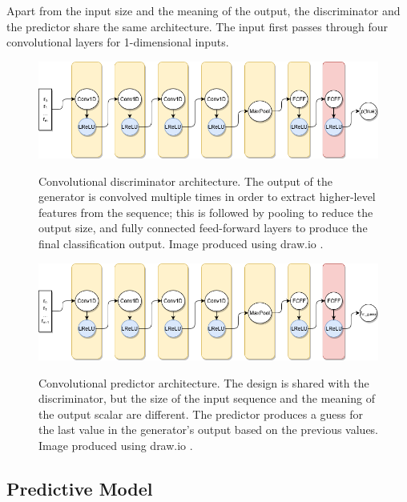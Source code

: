 \documentclass[12pt, titlepage]{report}
\theoremstyle{definition}
\begin{document}
Apart from the input size and the meaning of the output, the discriminator and the predictor share the same architecture. The input first passes through four convolutional layers for 1-dimensional inputs.

\begin{figure}
\centering
\includegraphics[width=1\textwidth]{img/discriminator.png}\\
\caption{Convolutional discriminator architecture. The output of the generator is convolved multiple times in order to extract higher-level features from the sequence; this is followed by pooling to reduce the output size, and fully connected feed-forward layers to produce the final classification output. Image produced using draw.io \cite{jgraph2018draw}.}
\label{figure:architecture_conv}
\end{figure}

\begin{figure}
\centering
\includegraphics[width=1\textwidth]{img/predictor.png}\\
\caption{Convolutional predictor architecture. The design is shared with the discriminator, but the size of the input sequence and the meaning of the output scalar are different. The predictor produces a guess for the last value in the generator's output based on the previous values. Image produced using draw.io \cite{jgraph2018draw}.}
\label{figure:architecture_conv}
\end{figure}



\subsection{Predictive Model}
\end{document}
